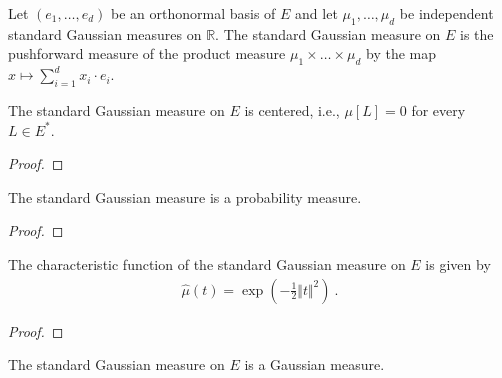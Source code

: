 \begin{definition}\label{def:stdGaussian}
  \leanok
Let $(e_1, \ldots, e_d)$ be an orthonormal basis of $E$ and let $\mu_1, \ldots, \mu_d$ be independent standard Gaussian measures on $\mathbb{R}$.
The standard Gaussian measure on $E$ is the pushforward measure of the product measure $\mu_1 \times \ldots \times \mu_d$ by the map $x \mapsto \sum_{i=1}^d x_i \cdot e_i$.
\end{definition}


\begin{lemma}\label{lem:isCentered_stdGaussian}
The standard Gaussian measure on $E$ is centered, i.e., $\mu[L] = 0$ for every $L \in E^*$.
\end{lemma}

\begin{proof}

\end{proof}


\begin{lemma}\label{lem:isProbabilityMeasure_stdGaussian}
  \leanok
The standard Gaussian measure is a probability measure.
\end{lemma}

\begin{proof}\leanok

\end{proof}


\begin{lemma}\label{lem:charFun_stdGaussian}
The characteristic function of the standard Gaussian measure on $E$ is given by
\begin{align*}
  \hat{\mu}(t) = \exp\left(-\frac{1}{2} \Vert t \Vert^2 \right) \: .
\end{align*}
\end{lemma}

\begin{proof}

\end{proof}


\begin{lemma}\label{lem:isGaussian_stdGaussian}
The standard Gaussian measure on $E$ is a Gaussian measure.
\end{lemma}


